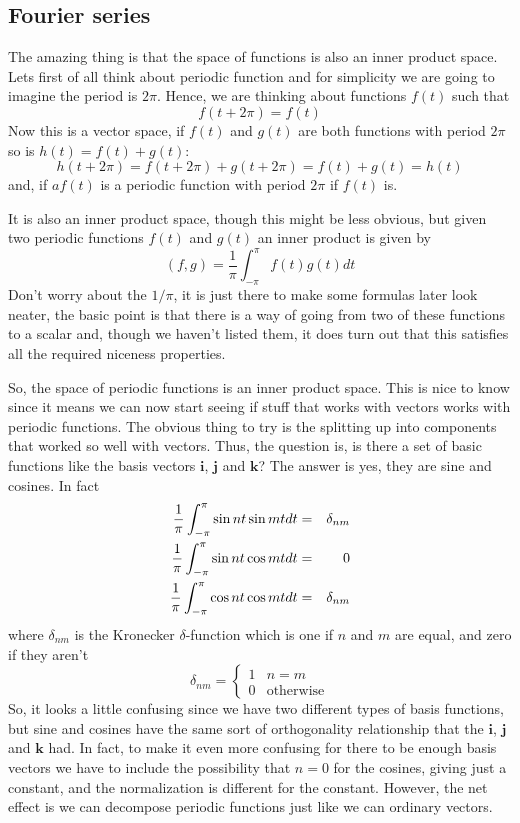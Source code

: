 \documentclass[12pt]{article}
\begin{document}
\subsection*{Fourier series}
The amazing thing is that the space of functions is also an inner
product space. Lets first of all think about periodic function and for
simplicity we are going to imagine the period is $2\pi$. Hence, we are thinking about functions $f(t)$ such that
\begin{equation}
f(t+2\pi)=f(t)
\end{equation}
Now this is a vector space, if $f(t)$ and $g(t)$ are both functions with period $2\pi$ so is $h(t)=f(t)+g(t)$:
\begin{equation}
h(t+2\pi)=f(t+2\pi)+g(t+2\pi)=f(t)+g(t)=h(t)
\end{equation}
and, if $af(t)$ is a periodic function with period $2\pi$ if $f(t)$
is. 

It is also an inner product space, though this might be less obvious,
but given two periodic functions $f(t)$ and $g(t)$ an inner product is
given by
\begin{equation}
(f,g)=\frac{1}{\pi}\int_{-\pi}^\pi f(t)g(t)dt
\end{equation}
Don't worry about the $1/\pi$, it is just there to make some formulas
later look neater, the basic point is that there is a way of going
from two of these functions to a scalar and, though we haven't listed
them, it does turn out that this satisfies all the required niceness
properties.

So, the space of periodic functions is an inner product space. This is
nice to know since it means we can now start seeing if stuff that
works with vectors works with periodic functions. The obvious thing to
try is the splitting up into components that worked so well with
vectors. Thus, the question is, is there a set of basic functions like
the basis vectors $\mathbf{i}$, $\mathbf{j}$ and $\mathbf{k}$? The
answer is yes, they are sine and cosines. In fact
\begin{eqnarray}
\frac{1}{\pi}\int_{-\pi}^\pi \sin{nt}\sin{mt}dt&=&\delta_{nm}\cr
\frac{1}{\pi}\int_{-\pi}^\pi \sin{nt}\cos{mt}dt&=&0\cr
\frac{1}{\pi}\int_{-\pi}^\pi \cos{nt}\cos{mt}dt&=&\delta_{nm}
\end{eqnarray}
where $\delta_{nm}$ is the Kronecker $\delta$-function which is one if $n$ and $m$ are equal, and zero if they aren't
\begin{equation}
\delta_{nm}=\left\{\begin{array}{ll}1&n=m\\0&\mbox{otherwise}\end{array}\right.
\end{equation}
So, it looks a little confusing since we have two different types of
basis functions, but sine and cosines have the same sort of
orthogonality relationship that the $\mathbf{i}$, $\mathbf{j}$ and
$\mathbf{k}$ had. In fact, to make it even more confusing for there to
be enough basis vectors we have to include the possibility that $n=0$
for the cosines, giving just a constant, and the normalization is
different for the constant. However, the net effect is we can
decompose periodic functions just like we can ordinary vectors.
\end{document}
